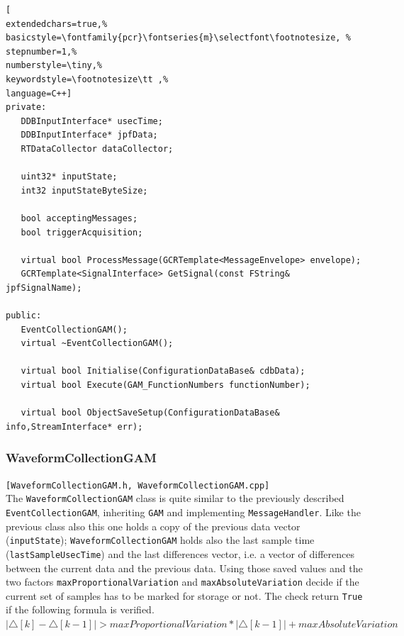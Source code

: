 \begin{lstlisting}[
extendedchars=true,%
basicstyle=\fontfamily{pcr}\fontseries{m}\selectfont\footnotesize, %
stepnumber=1,%
numberstyle=\tiny,%
keywordstyle=\footnotesize\tt ,%
language=C++]
private:
   DDBInputInterface* usecTime;
   DDBInputInterface* jpfData;
   RTDataCollector dataCollector;

   uint32* inputState;
   int32 inputStateByteSize;

   bool acceptingMessages;
   bool triggerAcquisition;

   virtual bool ProcessMessage(GCRTemplate<MessageEnvelope> envelope);
   GCRTemplate<SignalInterface> GetSignal(const FString& jpfSignalName);

public:
   EventCollectionGAM();
   virtual ~EventCollectionGAM();

   virtual bool Initialise(ConfigurationDataBase& cdbData);
   virtual bool Execute(GAM_FunctionNumbers functionNumber);

   virtual bool ObjectSaveSetup(ConfigurationDataBase& info,StreamInterface* err);
\end{lstlisting}



\subsubsection{WaveformCollectionGAM}
\texttt{[WaveformCollectionGAM.h, WaveformCollectionGAM.cpp]}\\
The \texttt{WaveformCollectionGAM} class is quite similar to the previously described \texttt{EventCollectionGAM}, inheriting \texttt{GAM} and implementing \texttt{MessageHandler}. Like the previous class also this one holds a copy of the previous data vector (\texttt{inputState}); \texttt{WaveformCollectionGAM} holds also the last sample time (\texttt{lastSampleUsecTime}) and the last differences vector, i.e. a vector of differences between the current data and the previous data. Using those saved values and the two factors \texttt{maxProportionalVariation} and \texttt{maxAbsoluteVariation} decide if the current set of samples has to be marked for storage or not. The check return \texttt{True} if the following formula is verified. \\


$| \triangle [k] - \triangle [k-1] | > maxProportionalVariation * | \triangle [k-1] | + maxAbsoluteVariation$ \\


